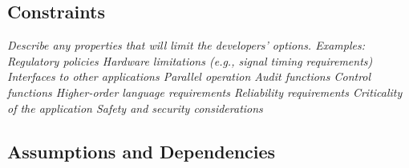 \subsection{Constraints}
\label{description:constraints}
\textit{Describe any properties that will limit the developers’ options. Examples:
Regulatory policies
Hardware limitations (e.g., signal timing requirements)
Interfaces to other applications
Parallel operation
Audit functions
Control functions
Higher-order language requirements
Reliability requirements
Criticality of the application
Safety and security considerations}



\subsection{Assumptions and Dependencies}
\label{description:assumptions}

